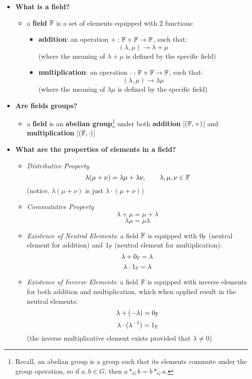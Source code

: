 \documentclass{exam}
\begin{document}
\begin{itemize}
    \item \textbf{What is a field?}
    \begin{itemize}
        \item a \textbf{field} $\mathbb{F}$ is a set of elements equipped with 2 functions:
        \begin{itemize}
            \item \textbf{addition}: an operation $+: \mathbb{F} \times \mathbb{F} \to \mathbb{F}$, such that:
            \[
            (\lambda, \mu) \to \lambda + \mu
            \]
            (where the meaning of $\lambda + \mu$ is defined by the specific field)
            \item \textbf{multiplication}: an operation $\cdot: \mathbb{F} \times \mathbb{F} \to \mathbb{F}$, such that:
            \[
            (\lambda, \mu) \to \lambda\mu
            \]
            (where the meaning of $\lambda\mu$ is defined by the specific field)
        \end{itemize}
    \end{itemize}
    \item \textbf{Are fields groups?}
    \begin{itemize}
        \item a \textbf{field} is an \textbf{abelian group}\footnote{Recall, an abelian group is a group such that its elements commute under the group operation, so if $a,b \in G$, then $a *_G b = b *_G a$.} under both \textbf{addition} [$(\mathbb{F}, +)$] and \textbf{multiplication} [$(\mathbb{F}, \cdot)$]
    \end{itemize}
    \item \textbf{What are the properties of elements in a field?}
    \begin{itemize}
        \item \textit{Distributive Property}
        \[
        \lambda(\mu + \nu) = \lambda\mu + \lambda\nu, \qquad \lambda, \mu, \nu \in \mathbb{F}
        \]
        (notice, $\lambda(\mu + \nu)$ is just $\lambda \cdot (\mu + \nu)$)
        \item \textit{Commutative Property}
        \[
        \lambda + \mu = \mu + \lambda
        \]
        \[
        \lambda\mu = \mu\lambda
        \]
        \item \textit{Existence of Neutral Elements}: a field $\mathbb{F}$ is equipped with $0_{\mathbb{F}}$ (neutral element for addition) and $1_{\mathbb{F}}$ (neutral element for multiplication):
        \[
        \lambda + 0_{\mathbb{F}} = \lambda
        \]
        \[
        \lambda \cdot 1_{\mathbb{F}} = \lambda
        \]
        \item \textit{Existence of Inverse Elements}: a field $\mathbb{F}$ is equipped with inverse elements for both addition and multiplication, which when applied result in the neutral elements:
        \[
        \lambda + (-\lambda) = 0_{\mathbb{F}}
        \]
        \[
        \lambda \cdot (\lambda^{-1}) = 1_{\mathbb{F}}
        \]
        (the inverse multiplicative element exists provided that $\lambda \neq 0$)
    \end{itemize}
\end{itemize}
\end{document}
